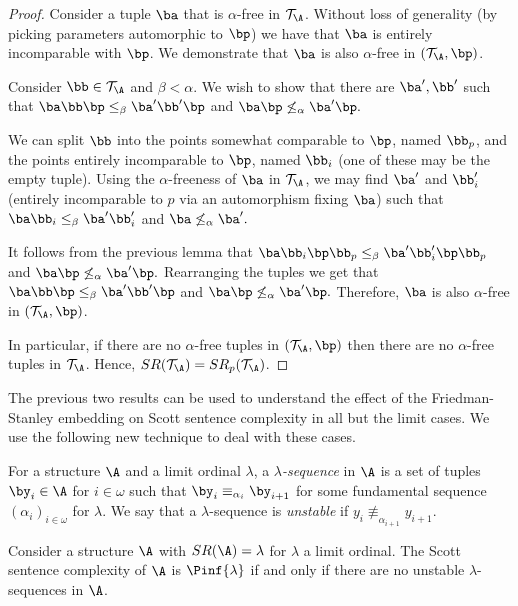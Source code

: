 \documentclass{amsart}
\newcommand{\T}{{\mathcal{T}}}
\newcommand{\SR}{SR}
\begin{document}
\begin{proof}
Consider a tuple $\ba$ that is $\alpha$-free in $\T_\A$.
Without loss of generality (by picking parameters automorphic to $\bp$) we have that $\ba$ is entirely incomparable with $\bp$.
We demonstrate that $\ba$ is also $\alpha$-free in $(\T_\A,\bp)$.

Consider $\bb\in \T_\A$ and $\beta<\alpha$.
We wish to show that there are $\ba',\bb'$ such that
$\ba\bb\bp\leq_\beta\ba'\bb'\bp$
and
$\ba\bp\not\leq_\alpha\ba'\bp.$

We can split $\bb$ into the points somewhat comparable to $\bp$, named $\bb_p$, and the points entirely incomparable to $\bp$, named $\bb_i$ (one of these may be the empty tuple).
Using the $\alpha$-freeness of $\ba$ in $\T_\A$, we may find $\ba'$ and $\bb_i'$ (entirely incomparable to $p$ via an automorphism fixing $\ba$) such that
$\ba\bb_i\leq_\beta\ba'\bb_i'$
and $\ba\not\leq_\alpha\ba'.$

It follows from the previous lemma that
$\ba\bb_i\bp\bb_p\leq_\beta\ba'\bb_i'\bp\bb_p$
and
$\ba\bp\not\leq_\alpha\ba'\bp.$
Rearranging the tuples we get that
$\ba\bb\bp\leq_\beta\ba'\bb'\bp$
and
$\ba\bp\not\leq_\alpha\ba'\bp.$
Therefore, $\ba$ is also $\alpha$-free in $(\T_\A,\bp)$.

In particular, if there are no $\alpha$-free tuples in $(\T_\A,\bp)$ then there
are no $\alpha$-free tuples in $\T_\A$. 
Hence, $\SR(\T_\A)=\SR_p(\T_\A)$. \end{proof}
The previous two results can be used to understand the effect of the
Friedman-Stanley embedding on Scott sentence complexity in all but the limit
cases. We use the following new technique to deal with these cases.

\begin{definition}
For a structure $\A$ and a limit ordinal $\lambda$, a
\textit{$\lambda$-sequence} in $\A$ is a set of tuples $\by_i\in \A$ for
$i\in\omega$ such that $\by_i\equiv_{\alpha_i}\by_{i+1}$ for some fundamental
sequence $(\alpha_i)_{i\in\omega}$ for $\lambda$.  We say that a $\lambda$-sequence is \textit{unstable} if $y_i\not\equiv_{\alpha_{i+1}}y_{i+1}$.
\end{definition}

\begin{lemma}
Consider a structure $\A$ with $\SR(\A)=\lambda$ for $\lambda$ a limit ordinal. The Scott sentence complexity
of $\A$ is $\Pinf{\lambda}$ if and only if there are no unstable
$\lambda$-sequences in $\A$.
\end{lemma}
\end{document}
